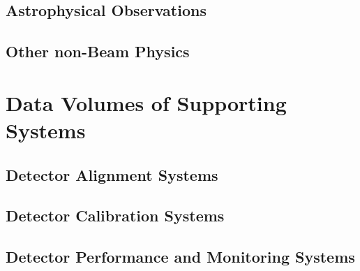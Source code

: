 \subsection{Astrophysical Observations}
\subsection{Other non-Beam Physics}

\section{Data Volumes of Supporting Systems}
\subsection{Detector Alignment Systems}
\subsection{Detector Calibration Systems}
\subsection{Detector Performance and Monitoring Systems}
